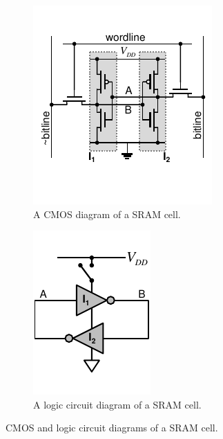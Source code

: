 \begin{figure}[h!]
    \centering
    \captionsetup{justification=centering,margin=0.5cm}
    \begin{subfigure}[c]{0.5\textwidth}
        \centering
        \includegraphics[width=0.85\linewidth]{images/transistor_sram_cell.pdf}
        \caption{A CMOS diagram of a SRAM cell.}
        \label{fig:sram_cell_cmos}
    \end{subfigure}%
    \begin{subfigure}[c]{0.5\textwidth}
        \centering
        \includegraphics[width=0.6728\linewidth]{images/logic_sram_cell.pdf}
        \caption{A logic circuit diagram of a SRAM cell.}
        \label{fig:sram_cell_logic}
    \end{subfigure}
    \caption[CMOS and logic circuit diagrams of a SRAM cell.]{CMOS and logic circuit diagrams of a SRAM cell.\cite{Maes2012}}
    \label{fig:sram_cell}
\end{figure}

